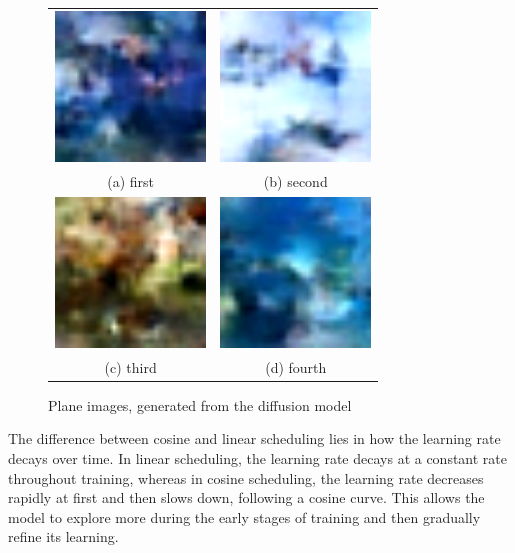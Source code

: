 \documentclass[conference]{IEEEtran}
\begin{document}
\begin{figure}
  \begin{tabular}{cc}
    \includegraphics[width=40mm]{./images/generated-imgs-cosine/plane/0000.png} 
&   \includegraphics[width=40mm]{./images/generated-imgs-cosine/plane/0001.png} 
\\
  (a) first 
  & (b) second \\[6pt]
      \includegraphics[width=40mm]{./images/generated-imgs-cosine/plane/0002.png} 
  &  \includegraphics[width=40mm]{./images/generated-imgs-cosine/plane/0003.png} 
\\
  (c) third & (d) fourth \\[6pt]
  \end{tabular}
  \caption{Plane images, generated from the diffusion model}
\end{figure}

The difference between cosine and linear scheduling lies in how the learning rate decays over time. In linear scheduling, the learning rate decays at a constant rate throughout training, whereas in cosine scheduling, the learning rate decreases rapidly at first and then slows down, following a cosine curve. This allows the model to explore more during the early stages of training and then gradually refine its learning.
\end{document}
